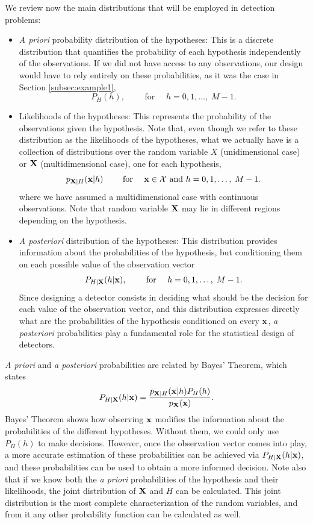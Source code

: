 We review now the main distributions that will be employed in detection problems:
\begin{itemize}
    \item {\em A priori} probability distribution of the hypotheses: This is a discrete distribution that quantifies the probability of each hypothesis independently of the observations. If we did not have access to any observations, our design would have to rely entirely on these probabilities, as it was the case in Section \ref{subsec:example1},
    $$P_H(h), \qquad \text{ for } \quad h = 0, 1, \ldots,\;M-1.$$
    
    \item Likelihoods of the hypotheses: This represents the probability of the observations given the hypothesis. Note that, even though we refer to these distribution as the likelihoods of the hypotheses, what we actually have is a collection of distributions over the random variable $X$ (unidimensional case) or ${\bf X}$ (multidimensional case), one for each hypothesis,
    $$p_{{\bf X}|H}({\bf x}|h) \qquad \text{ for } \quad {\bf x} \in {\cal X} \text{ and } h = 0, 1, \ldots,\; M-1.$$
    where we have assumed a multidimensional case with continuous observations. Note that random variable $\bf X$ may lie in different regions depending on the hypothesis.
    
    \item {\em A posteriori} distribution of the hypotheses: This distribution provides information about the probabilities of the hypothesis, but conditioning them on each possible value of the observation vector
    $$P_{H|{\bf X}}(h|{\bf x}), \qquad \text{ for } \quad h = 0, 1, \ldots,\; M-1.$$
    Since designing a detector consists in deciding what should be the decision for each value of the observation vector, and this distribution expresses directly what are the probabilities of the hypothesis conditioned on every $\bf x$, {\em a posteriori} probabilities play a fundamental role for the statistical design of detectors. 
    
\end{itemize}

{\em A priori} and {\em a posteriori} probabilities are related by Bayes' Theorem, which states
    $$P_{H|{\bf X}}(h|{\bf x}) = \frac{p_{{\bf  X} | H}({\bf x}|h) P_H(h)}{p_{\bf X}({\bf x})}.$$
Bayes' Theorem shows how observing $\bf x$ modifies the information about the probabilities of the different hypotheses. Without them, we could only use $P_H(h)$ to make decisions. However, once the observation vector comes into play, a more accurate estimation of these probabilities can be achieved via $P_{H|{\bf X}}(h|{\bf x})$, and these probabilities can be used to obtain a more informed decision. Note also that if we know both the {\em a priori} probabilities of the hypothesis and their likelihoods, the joint distribution of $\bf X$ and $H$ can be calculated. This joint distribution is the most complete characterization of the random variables, and from it any other probability function can be calculated as well.

